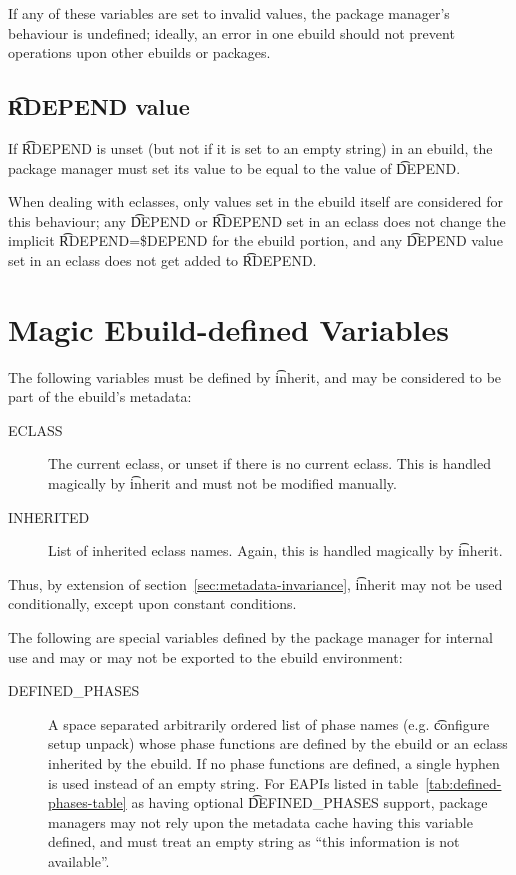 If any of these variables are set to invalid values, the package manager's behaviour is undefined;
ideally, an error in one ebuild should not prevent operations upon other ebuilds or packages.

\subsection{\t{RDEPEND} value}
\label{sec:rdepend-depend}

If \t{RDEPEND} is unset (but not if it is set to an empty string) in an ebuild, the package manager
must set its value to be equal to the value of \t{DEPEND}.

When dealing with eclasses, only values set in the ebuild itself are considered for this behaviour;
any \t{DEPEND} or \t{RDEPEND} set in an eclass does not change the implicit \t{RDEPEND=\$DEPEND} for
the ebuild portion, and any \t{DEPEND} value set in an eclass does not get added to \t{RDEPEND}.

\section{Magic Ebuild-defined Variables}

The following variables must be defined by \t{inherit}, and may be considered to be part
of the ebuild's metadata:

\begin{description}
\item[ECLASS] The current eclass, or unset if there is no current eclass. This is handled magically
    by \t{inherit} and must not be modified manually.
\item[INHERITED] List of inherited eclass names. Again, this is handled magically by \t{inherit}.
\end{description}

\note Thus, by extension of section~\ref{sec:metadata-invariance}, \t{inherit} may not be used
    conditionally, except upon constant conditions.

The following are special variables defined by the package manager for internal use and may or may
not be exported to the ebuild environment:

\begin{description}
\item[DEFINED\_PHASES] A space separated arbitrarily ordered list of phase names (e.g. \t{configure
setup unpack}) whose phase functions are defined by the ebuild or an eclass inherited by the ebuild.
If no phase functions are defined, a single hyphen is used instead of an empty string. For EAPIs
listed in table~\ref{tab:defined-phases-table} as having optional \t{DEFINED\_PHASES} support,
package managers may not rely upon the metadata cache having this variable defined, and must treat
an empty string as ``this information is not available''.
\end{description}

